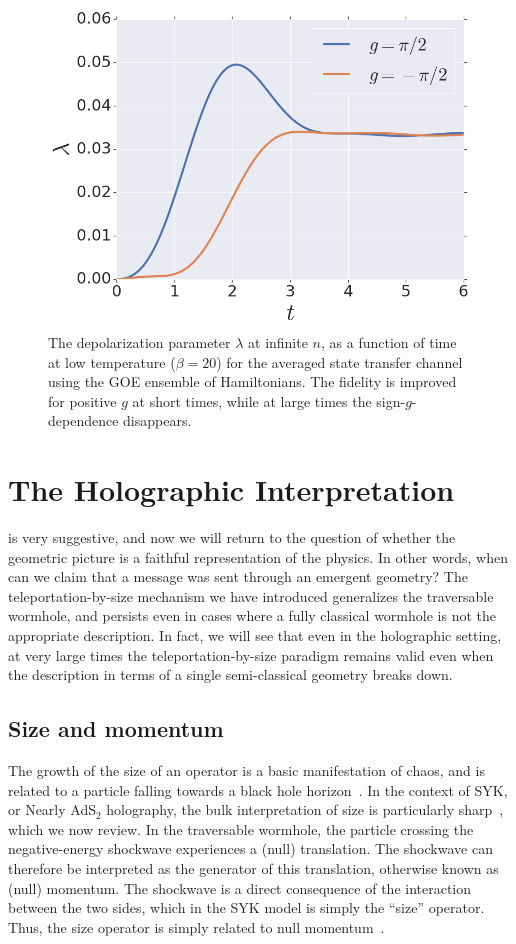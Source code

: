 \documentclass[aps,pra,reprint,floatfix,superscriptaddress, nofootinbib,longbibliography,onecolumn,notitlepage,12pt, tightenlines]{revtex4-1}
\begin{document}
\begin{figure}
\includegraphics[width=7 cm]{035}
\caption{The depolarization parameter $\lambda$ at infinite $n$, as a function of time at low temperature ($\beta=20$) for the averaged state transfer channel using the GOE ensemble of Hamiltonians. The fidelity is improved for positive $g$ at short times, while at large times the sign-$g$-dependence disappears.}\label{fig:GOE_maint}
\end{figure}


\section{The Holographic Interpretation}\label{sec:holography}
 is very suggestive, and now we will return to the question of whether the geometric picture is a faithful representation of the physics.
In other words, when can we claim that a message was sent through an emergent geometry?
The teleportation-by-size mechanism we have introduced generalizes the traversable wormhole, and persists even in cases where a fully classical wormhole is not the appropriate description.
In fact, we will see that even in the holographic setting, at very large times the teleportation-by-size paradigm remains valid even when the description in terms of a single semi-classical geometry breaks down.

\subsection{Size and momentum}
The growth of the size of an operator is a basic manifestation of chaos, and is related to a particle falling towards a black hole horizon~\cite{Roberts:2018mnp, Brown:2018kvn, qi2019quantum}. In the context of SYK, or Nearly AdS$_2$ holography, the bulk interpretation of size is particularly sharp~\cite{lin2019symmetries}, which we now review. In the traversable wormhole, the particle crossing the negative-energy shockwave experiences a (null) translation. The shockwave can therefore be interpreted as the generator of this translation, otherwise known as (null) momentum.
The shockwave is a direct consequence of the interaction between the two sides, which in the SYK model is simply the ``size'' operator. Thus, the size operator is simply related to null momentum~\cite{maldacena2017diving, lin2019symmetries, longpaper}.
\end{document}
